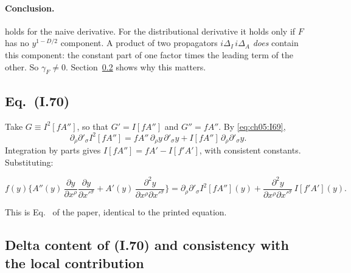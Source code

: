 \paragraph{Conclusion.}
 holds for the naive derivative. For the distributional derivative it holds only if $F$ has no $y^{1-D/2}$ component.
A product of two propagators $i\Delta_I\,i\Delta_A$ \emph{does} contain this component: the constant part of one factor times the leading term of the other.
So $\gamma_F\neq0$. Section~\ref{sec:ch05:t11:delta} shows why this matters.

\subsection[Eq. (I.70)]{Eq.~(I.70) \tD}

Take $G\equiv I^2[fA'']$, so that $G'=I[fA'']$ and $G''=fA''$. By \eqref{eq:ch05:I69},
\begin{equation*}
\partial_\rho\partial'_\sigma I^2[fA'']=fA''\,\partial_\rho y\,\partial'_\sigma y+I[fA'']\,\partial_\rho\partial'_\sigma y .
\end{equation*}
Integration by parts gives $I[fA'']=fA'-I[f'A']$, with consistent constants. Substituting:
\begin{resultbox}
\begin{equation}
f(y)\Big\{A''(y)\,\frac{\partial y}{\partial x^\rho}\frac{\partial y}{\partial x'^\sigma}+A'(y)\,\frac{\partial^2y}{\partial x^\rho\partial x'^\sigma}\Big\}
=\partial_\rho\partial'_\sigma I^2[fA''](y)+\frac{\partial^2y}{\partial x^\rho\partial x'^\sigma}\,I[f'A'](y).
\tag{I.70}\label{eq:ch05:I70}
\end{equation}
\end{resultbox}
\noindent This is Eq.~ of the paper, identical to the printed equation.

\subsection[Delta content of (I.70) and consistency with the local contribution]{Delta content of (I.70) and consistency with the local contribution \tD}
\label{sec:ch05:t11:delta}

